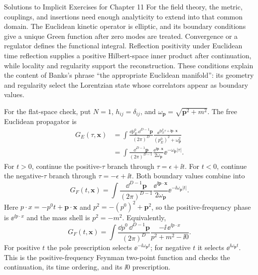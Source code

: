 \begin{bankssolutions}{Solutions to Implicit Exercises for Chapter 11}
For the field theory, the metric, couplings, and insertions need enough
analyticity to extend into that common domain.  The Euclidean kinetic operator
is elliptic, and its boundary conditions give a unique Green function after
zero modes are treated.  Convergence or a regulator defines the functional
integral.  Reflection positivity under Euclidean time reflection supplies a
positive Hilbert-space inner product after continuation, while locality and
regularity support the reconstruction.  These conditions explain the
content of Banks's phrase ``the appropriate Euclidean manifold'': its geometry
and regularity select the Lorentzian state whose correlators appear as boundary
values.

For the flat-space check, put
$N=1$, $h_{ij}=\delta_{ij}$, and
$\omega_{\mathbf p}=\sqrt{\mathbf p^2+m^2}$.  The free Euclidean propagator is
\begin{align*}
 G_E(\tau,\mathbf x)
 &=\int\frac{\dd p_E^0\,\dd^{D-1}\mathbf p}{(2\pi)^D}
 \frac{\ee^{\ii p_E^0\tau+\ii\mathbf p\cdot\mathbf x}}
 {(p_E^0)^2+\omega_{\mathbf p}^2}\\
 &=\int\frac{\dd^{D-1}\mathbf p}{(2\pi)^{D-1}}
 \frac{\ee^{\ii\mathbf p\cdot\mathbf x}}
 {2\omega_{\mathbf p}}\ee^{-\omega_{\mathbf p}|\tau|}.
\end{align*}
For $t>0$, continue the positive-$\tau$ branch through
$\tau=\epsilon+\ii t$.  For $t<0$, continue the negative-$\tau$ branch through
$\tau=-\epsilon+\ii t$.  Both boundary values combine into
\[
 G_F(t,\mathbf x)
 =\int\frac{\dd^{D-1}\mathbf p}{(2\pi)^{D-1}}
 \frac{\ee^{\ii\mathbf p\cdot\mathbf x}}
 {2\omega_{\mathbf p}}\ee^{-\ii\omega_{\mathbf p}|t|}.
\]
Here $p\mathbin{\cdot}x=-p^0t+\mathbf p\mathbin{\cdot}\mathbf x$ and
$p^2=-(p^0)^2+\mathbf p^2$, so the positive-frequency phase is
$\ee^{\ii p\mathbin{\cdot}x}$ and the mass shell is $p^2=-m^2$.
Equivalently,
\[
 G_F(t,\mathbf x)
 =\int\frac{\dd p^0\,\dd^{D-1}\mathbf p}{(2\pi)^D}
 \frac{-\ii\,\ee^{\ii p\mathbin{\cdot}x}}
 {p^2+m^2-\ii0}.
\]
For positive $t$ the pole prescription selects
$\ee^{-\ii\omega_{\mathbf p}t}$; for negative $t$ it selects
$\ee^{\ii\omega_{\mathbf p}t}$.  This is the positive-frequency Feynman
two-point function and checks the continuation, its time ordering, and its
$\ii0$ prescription.

\end{bankssolutions}
